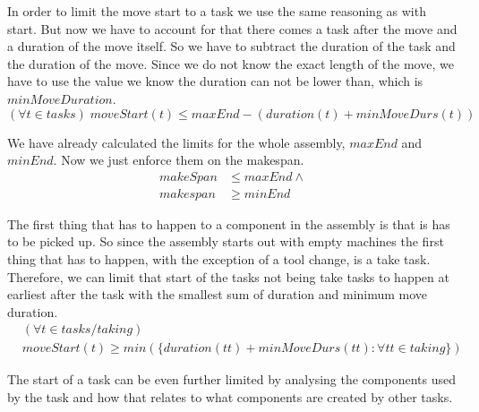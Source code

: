   \noindent In order to limit the move start to a task we use the same reasoning as with start. But now we have to account for that there comes a task after the move and a duration of the move itself. So we have to subtract the duration of the task and the duration of the move. Since we do not know the exact length of the move, we have to use the value we know the duration can not be lower than, which is $minMoveDuration$.
  \begin{equation}\label{eq:63}
  (\forall t \in tasks) \; moveStart(t) \le maxEnd-(duration(t)+minMoveDurs(t))
  \end{equation}

  \noindent  We have already calculated the limits for the whole assembly, $maxEnd$ and $minEnd$. Now we just enforce them on the makespan.
  \begin{equation}\label{eq:66}
  \begin{aligned}
  makeSpan &\le maxEnd \land\\
  makespan &\ge minEnd
  \end{aligned}
  \end{equation}

   \noindent The first thing that has to happen to a component in the assembly is that is has to be picked up. So since the assembly starts out with empty machines the first thing that has to happen, with the exception of a tool change, is a take task. Therefore, we can limit that start of the tasks not being take tasks to happen at earliest after the task with the smallest sum of duration and minimum move duration.
  \begin{equation}
  \begin{aligned}\label{eq:69}
  &(\forall t \in tasks / taking) \\
  &moveStart(t) \ge min(\{duration(tt) + minMoveDurs(tt) : \forall tt \in taking\})
  \end{aligned}
  \end{equation}

  \noindent  The start of a task can be even further limited by analysing the components used by the task and how that relates to what components are created by other tasks.
    
